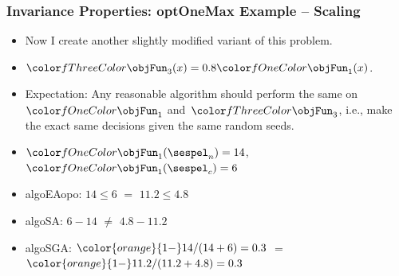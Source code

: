 \documentclass[aspectratio=169,mathserif,notheorems]{beamer}%
\begin{document}
%
%
\begin{frame}%
\frametitle{Invariance Properties: \gls{optOneMax} Example -- Scaling}%
\parbox{0.415\paperwidth}{%
\begin{itemize}%
\item Now I create another slightly modified variant of this problem.%
\item<2-> $\fn{3}(x)=0.8\fn{1}(x)$.%
\item<3-> Expectation: Any reasonable algorithm should perform the same on~$\fn{1}$ and~$\fn{3}$, i.e., make the exact same decisions given the same random seeds.%
%
\item<5-> $\fn{1}(\sespel_n)=14$, $\fn{1}(\sespel_c)=6$%
%
\item<7-> \gls{algoEAopo}: $14\leq6$ \textcolor{greenYesColor}{$\mathbf{=}$} $11.2\leq4.8$ \greenYes%
%
\item<8-> \gls{algoSA}: $6-14$ \textcolor{redNoColor}{$\mathbf{\neq}$} $4.8-11.2$ \redNo%
%
\item<9-> \gls{algoSGA}: ${\color{orange}{1-}}14/(14+6)=0.3$ \textcolor{greenYesColor}{$\mathbf{=}$} ${\color{orange}{1-}}11.2/(11.2+4.8)=0.3$ \greenYes%
\end{itemize}%
}%
%
%
%
%
%
%
%
%
%
\end{frame}%
%
\end{document}

